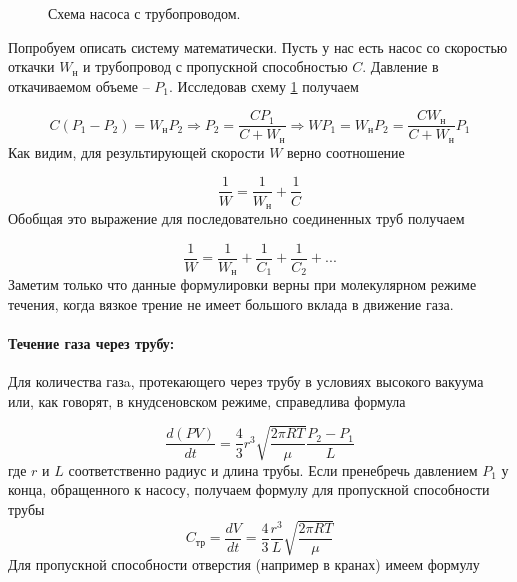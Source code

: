\documentclass{article}
\begin{document}
    \begin{figure}[h]
        \caption{Схема насоса с трубопроводом.}
        \label{ris:nasos_sketch}
    \end{figure}
    Попробуем описать систему математически. Пусть у нас есть насос со скоростью откачки $W_н$ и трубопровод с пропускной способностью $C$. Давление в откачиваемом объеме -- $P_1$. Исследовав схему \ref{ris:nasos_sketch} получаем

    \begin{equation*}
        C(P_1 - P_2)=W_нP_2 \Rightarrow P_2=\frac{CP_1}{C+W_н} \Rightarrow WP_1=W_нP_2=\frac{CW_н}{C+W_н}P_1
    \end{equation*}
    Как видим, для результирующей скорости $W$ верно соотношение

    \begin{equation*}
        \frac{1}{W} = \frac{1}{W_н} + \frac{1}{C}
    \end{equation*}
    Обобщая это выражение для последовательно соединенных труб получаем

    \begin{equation}
        \frac{1}{W} = \frac{1}{W_н} + \frac{1}{C_1} + \frac{1}{C_2} + ...
        \label{resulting_speed}
    \end{equation}
    Заметим только что данные формулировки верны при молекулярном режиме течения, когда вязкое трение не имеет большого вклада в движение газа.

    \paragraph{Течение газа через трубу:} Для количества газa, протекающего через трубу в условиях высокого вакуума или, как говорят, в кнудсеновском режиме, справедлива формула

    \begin{equation}
        \frac{d(PV)}{dt} = \frac{4}{3}r^3 \sqrt{\frac{2\pi RT}{\mu}} \frac{P_2 - P_1}{L}
        \label{prop_spos_truba}
    \end{equation}
    где $r$ и $L$ соответственно радиус и длина трубы. Если пренебречь давлением $P_1$ у конца, обращенного к насосу, получаем формулу для пропускной способности трубы
    \begin{equation}
    C_{тр} = \frac{dV}{dt} = \frac{4}{3}\frac{r^3}{L}\sqrt{\frac{2\pi RT}{\mu}}
    \end{equation}
    Для пропускной способности отверстия (например в кранах) имеем формулу
\end{document}
